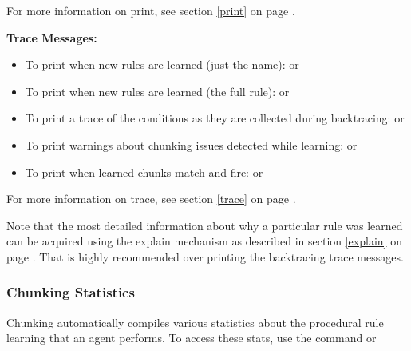 For more information on print, see section \ref{print} on page \pageref{print}.

\textbf{Trace Messages:}
\begin{itemize}
	\item To print when new rules are learned (just the name): \newline {} or   
	\item To print when new rules are learned (the full rule): \newline {} or   
	\item To print a trace of the conditions as they are collected during backtracing: \newline {} or   
	\item To print warnings about chunking issues detected while learning:  \newline {} or 
	\item To print when learned chunks match and fire: \newline  {} or   
\end{itemize}
For more information on trace, see section \ref{trace} on page \pageref{trace}.

Note that the most detailed information about why a particular rule was learned can be acquired using the explain mechanism as described in section \ref{explain} on page \pageref{explain}.  That is highly recommended over printing the backtracing trace messages.

\subsubsection{Chunking Statistics}

Chunking automatically compiles various statistics about the procedural rule learning that an agent performs.  To access these stats, use the command  or 

